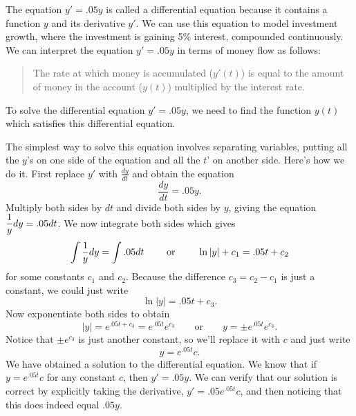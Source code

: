 \begin{example}
The equation $y' = .05 y$ is called a differential equation because it contains a function $y$ and its derivative $y'$. 
We can use this equation to model investment growth, where the investment is gaining 5\% interest, compounded continuously. 
We can interpret the equation $y' = .05 y$ in terms of money flow as follows:
\begin{quote}
	The rate at which money is accumulated ($y'(t)$) is equal to the amount of money in the account ($y(t)$) multiplied by the interest rate.  
\end{quote}
To solve the differential equation $y' = .05 y$, we need to find the function $y(t)$ which satisfies this differential equation.  

The simplest way to solve this equation involves separating variables, putting all the $y$'s on one side of the equation and all the $t$' on another side.  
Here's how we do it. 
First replace $y'$ with $\frac{dy}{dt}$ and obtain the equation $$\frac{dy}{dt} = .05 y.$$ 
Multiply both sides by $dt$ and divide both sides by $y$, giving the equation $\displaystyle \frac{1}{y}dy=.05 dt$. 
We now integrate both sides which gives 
$$\displaystyle\int \frac{1}{y}dy = \int .05dt\quad\quad\text{ or }\quad \quad \ln|y|+c_1=.05 t +c_2$$ for some constants $c_1$ and $c_2$.  
Because the difference $c_3=c_2-c_1$ is just a constant, we could just write $$\ln|y|=.05 t +c_3.$$ 
Now exponentiate both sides to obtain 
$$|y|=e^{.05 t+c_3} = e^{.05t}e^{c_3}\quad\quad\text{or}\quad\quad y=\pm e^{.05t}e^{c_3}.$$  
Notice that $\pm e^{c_3}$ is just another constant, so we'll replace it with $c$ and just write 
$$y=e^{.05 t}c.$$ 
We have obtained a solution to the differential equation.  We know that if $y=e^{.05 t}c$ for any constant $c$, then $y' = .05 y$.  We can verify that our solution is correct by explicitly taking the derivative, $y' = .05 e^{.05 t}c$, and then noticing that this does indeed equal $.05 y$.



\end{example}
